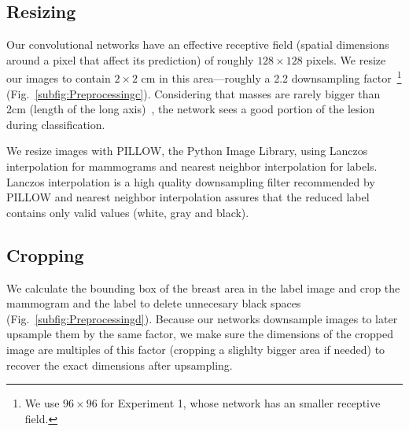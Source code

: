 \subsection{Resizing}
Our convolutional networks have an effective receptive field (spatial dimensions around a pixel that affect its prediction) of roughly $128 \times 128$ pixels.
We resize our images to contain $2 \times 2$ cm in this area---roughly a 2.2 downsampling factor~\footnote{We use $96 \times 96$ for Experiment 1, whose network has an smaller receptive field.} (Fig.~\ref{subfig:Preprocessingc}). Considering that masses are rarely bigger than 2cm (length of the long axis)~\cite{Sahiner1996}, the network sees a good portion of the lesion during classification. 

We resize images with PILLOW, the Python Image Library, using Lanczos interpolation for mammograms and nearest neighbor interpolation for labels. Lanczos interpolation is a high quality downsampling filter recommended by PILLOW and nearest neighbor interpolation assures that the reduced label contains only valid values (white, gray and black).

\subsection{Cropping}
We calculate the bounding box of the breast area in the label image and crop the mammogram and the label to delete unnecesary black spaces (Fig.~\ref{subfig:Preprocessingd}). 
Because our networks downsample images to later upsample them by the same factor, we make sure the dimensions of the cropped image are multiples of this factor (cropping a slighlty bigger area if needed) to recover the exact dimensions after upsampling.

